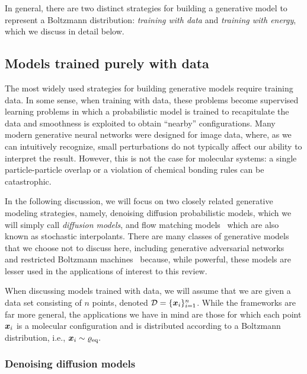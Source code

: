 \documentclass[11pt]{article}
\begin{document}
In general, there are two distinct strategies for building a generative model to represent a Boltzmann distribution: \emph{training with data} and \emph{training with energy}, which we discuss in detail below. 



\subsection{Models trained purely with data}

The most widely used strategies for building generative models require training data.
In some sense, when training with data, these problems become supervised learning problems in which a probabilistic model is trained to recapitulate the data and smoothness is exploited to obtain ``nearby'' configurations.
Many modern generative neural networks were designed for image data, where, as we can intuitively recognize, small perturbations do not typically affect our ability to interpret the result. 
However, this is not the case for molecular systems: a single particle-particle overlap or a violation of chemical bonding rules can be catastrophic. 

In the following discussion, we will focus on two closely related generative modeling strategies, namely, denoising diffusion probabilistic models, which we will simply call \emph{diffusion models}, and flow matching models~\cite{lipman_flow_2022, albergo_building_2023, albergo_stochastic_2023} which are also known as stochastic interpolants.  
There are many classes of generative models that we choose not to discuss here, including generative adversarial networks~\cite{goodfellow_generative_2014} and restricted Boltzmann machines~\cite{salakhutdinov_restricted_2007, salakhutdinov_deep_2009} because, while powerful, these models are lesser used in the applications of interest to this review. 

When discussing models trained with data, we will assume that we are given a data set consisting of $n$ points, denoted $\mathcal{D} = \{ \boldsymbol{x}_i \}_{i=1}^n$.
While the frameworks are far more general, the applications we have in mind are those for which each point $\boldsymbol{x}_i$ is a molecular configuration and is distributed according to a Boltzmann distribution, i.e., $\boldsymbol{x}_i \sim \varrho_{\rm eq}.$

\subsubsection{Denoising diffusion models}\label{sec:diffusion}
\end{document}
